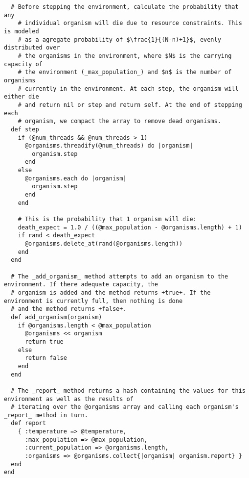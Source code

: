 \begin{lstlisting}
  # Before stepping the environment, calculate the probability that any
	# individual organism will die due to resource constraints. This is modeled
	# as a agregate probability of $\frac{1}{(N-n)+1}$, evenly distributed over
	# the organisms in the environment, where $N$ is the carrying capacity of
	# the environment (_max_population_) and $n$ is the number of organisms
	# currently in the environment. At each step, the organism will either die
	# and return nil or step and return self. At the end of stepping each
	# organism, we compact the array to remove dead organisms.
  def step
    if (@num_threads && @num_threads > 1)
      @organisms.threadify(@num_threads) do |organism|
        organism.step
      end
    else
      @organisms.each do |organism|
        organism.step
      end
    end

    # This is the probability that 1 organism will die:
    death_expect = 1.0 / ((@max_population - @organisms.length) + 1)
    if rand < death_expect
      @organisms.delete_at(rand(@organisms.length))
    end
  end

  # The _add_organism_ method attempts to add an organism to the environment. If there adequate capacity, the
  # organism is added and the method returns +true+. If the environment is currently full, then nothing is done
  # and the method returns +false+.
  def add_organism(organism)
    if @organisms.length < @max_population
      @organisms << organism
      return true
    else
      return false
    end
  end

  # The _report_ method returns a hash containing the values for this environment as well as the results of
  # iterating over the @organisms array and calling each organism's _report_ method in turn.
  def report
    { :temperature => @temperature,
      :max_population => @max_population,
      :current_population => @organisms.length,
      :organisms => @organisms.collect{|organism| organism.report} }
  end
end
\end{lstlisting}
